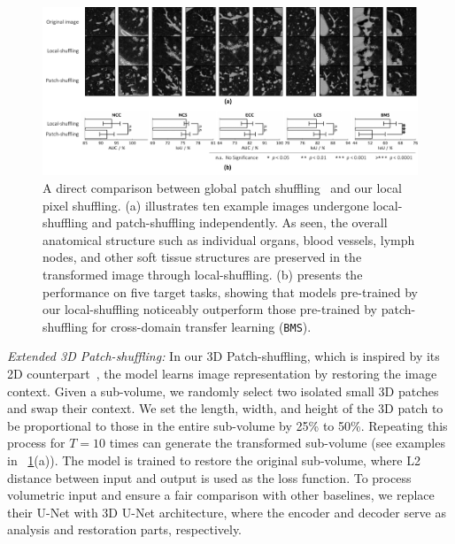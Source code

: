 \begin{figure}[t]
\begin{center}
\includegraphics[width=1.0\linewidth]{Figures/AP2/fig_localshuffling_patchshuffling.pdf}
\end{center}
\caption[Comparison Between Global Patch Shuffling and Local Pixel Shuffling]{
A direct comparison between global patch shuffling~\citep{chen2019self} and our local pixel shuffling. (a) illustrates ten example images undergone local-shuffling and patch-shuffling independently. As seen, the overall anatomical structure such as individual organs, blood vessels, lymph nodes, and other soft tissue structures are preserved in the transformed image through local-shuffling.
(b) presents the performance on five target tasks, showing that models pre-trained by our local-shuffling noticeably outperform those pre-trained by patch-shuffling for cross-domain transfer learning (\texttt{BMS}). 
}
\label{ap2:fig:localshuffling_patchshuffling}
\end{figure}

\textit{Extended 3D Patch-shuffling:} In our 3D Patch-shuffling, which is inspired by its 2D counterpart~\citep{chen2019self}, the model learns image representation by restoring the image context. Given a sub-volume, we randomly select two isolated small 3D patches and swap their context. We set the length, width, and height of the 3D patch to be proportional to those in the entire sub-volume by 25\% to 50\%. Repeating this process for $T=10$ times can generate the transformed sub-volume (see examples in \figurename~\ref{ap2:fig:localshuffling_patchshuffling}(a)). The model is trained to restore the original sub-volume, where L2 distance between input and output is used as the loss function. To process volumetric input and ensure a fair comparison with other baselines, we replace their U-Net with 3D U-Net architecture, where the encoder and decoder serve as analysis and restoration parts, respectively.

